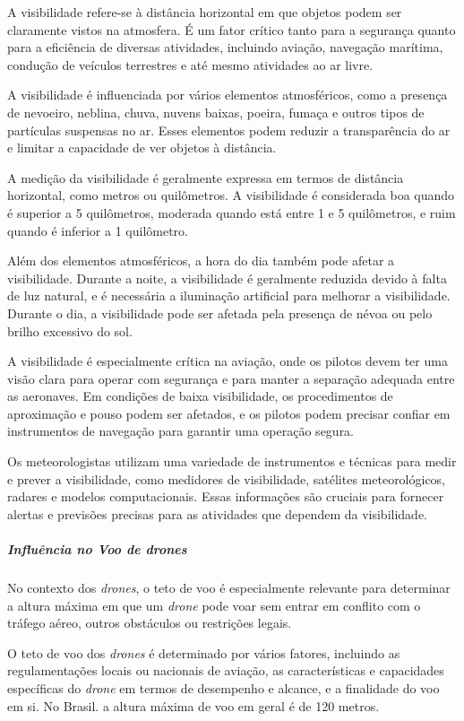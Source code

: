 \documentclass[a4paper, 12pt, onecolumn,singlespacing]{article}
\begin{document}
	A visibilidade refere-se à distância horizontal em que objetos podem ser claramente vistos na atmosfera. É um fator crítico tanto para a segurança quanto para a eficiência de diversas atividades, incluindo aviação, navegação marítima, condução de veículos terrestres e até mesmo atividades ao ar livre.
	
	A visibilidade é influenciada por vários elementos atmosféricos, como a presença de nevoeiro, neblina, chuva, nuvens baixas, poeira, fumaça e outros tipos de partículas suspensas no ar. Esses elementos podem reduzir a transparência do ar e limitar a capacidade de ver objetos à distância.
	
	A medição da visibilidade é geralmente expressa em termos de distância horizontal, como metros ou quilômetros. A visibilidade é considerada boa quando é superior a 5 quilômetros, moderada quando está entre 1 e 5 quilômetros, e ruim quando é inferior a 1 quilômetro.
	
	Além dos elementos atmosféricos, a hora do dia também pode afetar a visibilidade. Durante a noite, a visibilidade é geralmente reduzida devido à falta de luz natural, e é necessária a iluminação artificial para melhorar a visibilidade. Durante o dia, a visibilidade pode ser afetada pela presença de névoa ou pelo brilho excessivo do sol.
	
	A visibilidade é especialmente crítica na aviação, onde os pilotos devem ter uma visão clara para operar com segurança e para manter a separação adequada entre as aeronaves. Em condições de baixa visibilidade, os procedimentos de aproximação e pouso podem ser afetados, e os pilotos podem precisar confiar em instrumentos de navegação para garantir uma operação segura.
	
	Os meteorologistas utilizam uma variedade de instrumentos e técnicas para medir e prever a visibilidade, como medidores de visibilidade, satélites meteorológicos, radares e modelos computacionais. Essas informações são cruciais para fornecer alertas e previsões precisas para as atividades que dependem da visibilidade.
	
	\subparagraph{Influência no Voo de \textit{drones}}

	No contexto dos \textit{drones}, o teto de voo é especialmente relevante para determinar a altura máxima em que um \textit{drone} pode voar sem entrar em conflito com o tráfego aéreo, outros obstáculos ou restrições legais.
	
	O teto de voo dos \textit{drones} é determinado por vários fatores, incluindo as regulamentações locais ou nacionais de aviação, as características e capacidades específicas do \textit{drone} em termos de desempenho e alcance, e a finalidade do voo em si. No Brasil. a altura máxima de voo em geral é de 120 metros.
	
\end{document}
